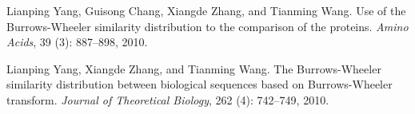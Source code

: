 \documentclass{elsarticle}
\begin{document}
\begin{thebibliography}{35}
Lianping Yang, Guisong Chang, Xiangde Zhang, and Tianming Wang.
\newblock Use of the {Burrows-Wheeler} similarity distribution to the
  comparison of the proteins.
\newblock \emph{Amino Acids}, 39 (3): 887--898,
  2010{}.

Lianping Yang, Xiangde Zhang, and Tianming Wang.
\newblock The {Burrows-Wheeler} similarity distribution between biological
  sequences based on {Burrows-Wheeler} transform.
\newblock \emph{Journal of Theoretical Biology}, 262 (4):
  742--749, 2010{}.

\end{thebibliography}
\end{document}
